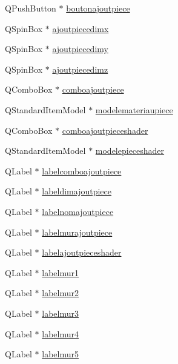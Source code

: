 \begin{DoxyCompactItemize}
\item 
Q\+Push\+Button $\ast$ \hyperlink{class_main_window_ad6c5d4342e58b7edad16490d493ea342}{boutonajoutpiece}
\item 
Q\+Spin\+Box $\ast$ \hyperlink{class_main_window_aa75a74b6d22f3363190785617dba7dc2}{ajoutpiecedimx}
\item 
Q\+Spin\+Box $\ast$ \hyperlink{class_main_window_a4d95aef4c72cb18b0599c4e525d1ccdf}{ajoutpiecedimy}
\item 
Q\+Spin\+Box $\ast$ \hyperlink{class_main_window_a2c29b0021713ae3d3f317fb54fdb4962}{ajoutpiecedimz}
\item 
Q\+Combo\+Box $\ast$ \hyperlink{class_main_window_acb844d7f147cf7f5114e0a626c9564df}{comboajoutpiece}
\item 
Q\+Standard\+Item\+Model $\ast$ \hyperlink{class_main_window_a7bdcda1e4a341f69651631c5ee882c41}{modelemateriaupiece}
\item 
Q\+Combo\+Box $\ast$ \hyperlink{class_main_window_ad7c2aad3dda2062d4d26a14709e54ff1}{comboajoutpieceshader}
\item 
Q\+Standard\+Item\+Model $\ast$ \hyperlink{class_main_window_a6be7cafd28d97201c3df69a7b144f456}{modelepieceshader}
\item 
Q\+Label $\ast$ \hyperlink{class_main_window_a5a72195fa8145f88d29886d680f741a0}{labelcomboajoutpiece}
\item 
Q\+Label $\ast$ \hyperlink{class_main_window_ac017a38253ab695f0098c7c853e46f9b}{labeldimajoutpiece}
\item 
Q\+Label $\ast$ \hyperlink{class_main_window_a1d3e7516cbe9514b90e22cf6dc175459}{labelnomajoutpiece}
\item 
Q\+Label $\ast$ \hyperlink{class_main_window_a24709250991f21e3c2672f1e76569d0d}{labelmurajoutpiece}
\item 
Q\+Label $\ast$ \hyperlink{class_main_window_a2c60769cc5ab003462a9d183c26792cc}{labelajoutpieceshader}
\item 
Q\+Label $\ast$ \hyperlink{class_main_window_a2a21ea46a1f1be6c8f474902aaa74bf1}{labelmur1}
\item 
Q\+Label $\ast$ \hyperlink{class_main_window_af5c6fd2af3aa1d234476a0404927c206}{labelmur2}
\item 
Q\+Label $\ast$ \hyperlink{class_main_window_a586d64e68a953b3506846e937df60509}{labelmur3}
\item 
Q\+Label $\ast$ \hyperlink{class_main_window_a1ce750a7b2152528b4bf5153f9b50f55}{labelmur4}
\item 
Q\+Label $\ast$ \hyperlink{class_main_window_aa1074d2c5241b1cf88d93186225f1ed4}{labelmur5}

\end{DoxyCompactItemize}
